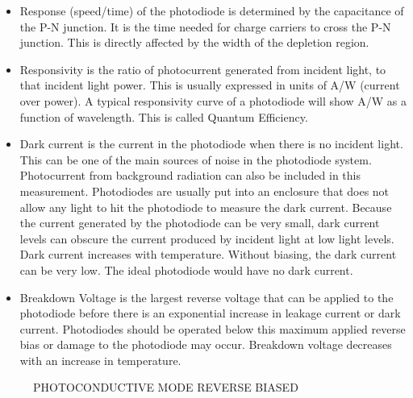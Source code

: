 \documentclass[main.tex]{subfiles}
\begin{document}
\begin{enumerate}
\begin{enumerate}
        \begin{itemize}
            \item Response (speed/time) of the photodiode is determined by the capacitance of the P-N junction. It is the time needed for charge carriers to cross the P-N junction. This is directly affected by the width of the depletion region.
            \item Responsivity is the ratio of photocurrent generated from incident light, to that incident light power. This is usually expressed in units of A/W (current over power). A typical responsivity curve of a photodiode will show A/W as a function of wavelength. This is called Quantum Efficiency.
            \item Dark current is the current in the photodiode when there is no incident light. This can be one of the main sources of noise in the photodiode system. Photocurrent from background radiation can also be included in this measurement. Photodiodes are usually put into an enclosure that does not allow any light to hit the photodiode to measure the dark current. Because the current generated by the photodiode can be very small, dark current levels can obscure the current produced by incident light at low light levels. Dark current increases with temperature. Without biasing, the dark current can be very low. The ideal photodiode would have no dark current.
            \item Breakdown Voltage is the largest reverse voltage that can be applied to the photodiode before there is an exponential increase in leakage current or dark current. Photodiodes should be operated below this maximum applied reverse bias or damage to the photodiode may occur. Breakdown voltage decreases with an increase in temperature.
        \end{itemize}

        \begin{figure}
        \centering{}
        \caption{PHOTOCONDUCTIVE MODE REVERSE BIASED}
        \label{fig:16a_c}
        \end{figure}


\end{enumerate}
\end{enumerate}
\end{document}
